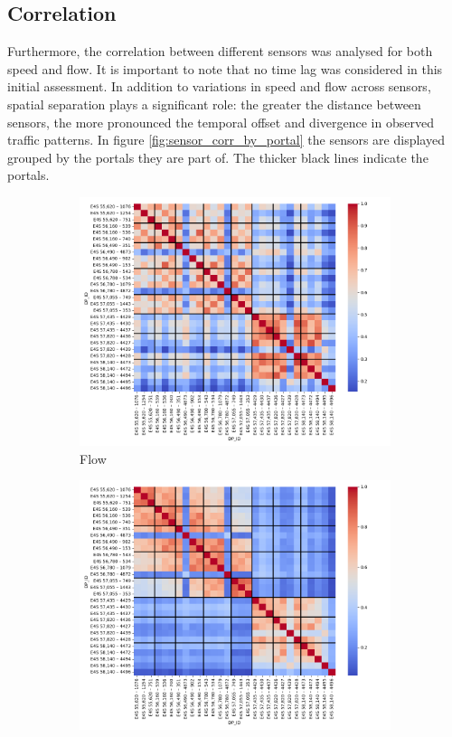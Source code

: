 	\subsection{Correlation}
	Furthermore, the correlation between different sensors was analysed for both speed and flow. It is important to note that no time lag was considered in this initial assessment. In addition to variations in speed and flow across sensors, spatial separation plays a significant role: the greater the distance between sensors, the more pronounced the temporal offset and divergence in observed traffic patterns. In figure \ref{fig:sensor_corr_by_portal} the sensors are displayed grouped by the portals they are part of. The thicker black lines indicate the portals.
	\begin{figure}[H]
		\centering
		\begin{subfigure}{0.9 \linewidth}
			\includegraphics[width=\textwidth]{../Plots/Flow/sensor_corr_by_portal}
			\caption{Flow}
		\end{subfigure}
		\begin{subfigure}{0.9 \linewidth}
			\includegraphics[width=\textwidth]{../Plots/Speed/sensor_corr_by_portal}

\end{subfigure}
\end{figure}
